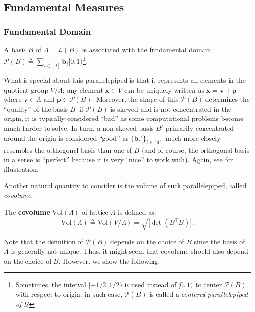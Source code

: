 \documentclass{template}
\begin{document}
\subsection{Fundamental Measures}

\subsubsection{Fundamental Domain}

A basis $B$ of $\Lambda = \mathcal{L}(B)$ is associated with the fundamental
domain $\mathcal{P}(B) \triangleq \sum_{i \in
[d]}\mathbf{b}_i[0,1)$\footnote{Sometimes, the interval $[-1/2, 1/2)$ is used
instead of $[0,1)$ to center $\mathcal{P}(B)$ with respect to origin: in such
case, $\mathcal{P}(B)$ is called a \textit{centered parallelepiped of $B$}}.

What is special about this parallelepiped is that it represents all elements in
the quotient group $V/\Lambda$: any element $\mathbf{x} \in V$ can be uniquely
written as $\mathbf{x} = \mathbf{v} + \mathbf{p}$ where $\mathbf{v} \in \Lambda$
and $\mathbf{p} \in \mathcal{P}(B)$. Moreover, the shape of this
$\mathcal{P}(B)$ determines the ``quality'' of the basis $B$: if
$\mathcal{P}(B)$ is skewed and is not concentrated in the origin, it is
typically considered ``bad'' as some computational problems become much harder
to solve. In turn, a non-skewed basis $B'$ primarily concentrated around the
origin is considered ``good'' as $\{\mathbf{b}_i'\}_{i \in [d]}$ much more
closely resembles the orthogonal basis than one of $B$ (and of course, the
orthogonal basis in a sense is ``perfect'' because it is very ``nice'' to work
with). Again, see  for illustration.

Another natural quantity to consider is the volume of such parallelepiped,
called \textit{covolume}.

\begin{definition}[Covolume]
    The \textbf{covolume} $\text{Vol}(\Lambda)$ of lattice $\Lambda$ is defined as:
    \begin{equation*}
        \text{Vol}(\Lambda) \triangleq \text{Vol}(V/\Lambda) = \sqrt{|\det(B^{\top}B)|}.
    \end{equation*}
\end{definition}

Note that the definition of $\mathcal{P}(B)$ depends on the choice of $B$ since
the basis of $\Lambda$ is generally not unique. Thus, it might seem that
covolume should also depend on the choice of $B$. However, we show the
following.
\end{document}
